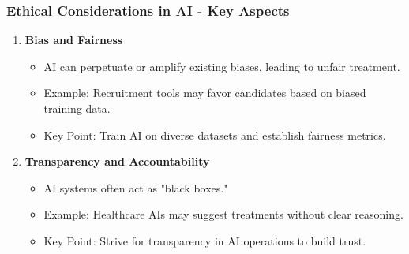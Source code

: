\documentclass[aspectratio=169]{beamer}
\begin{document}
\begin{frame}[fragile]
    \frametitle{Ethical Considerations in AI - Key Aspects}
    \begin{enumerate}
        \item \textbf{Bias and Fairness}
            \begin{itemize}
                \item AI can perpetuate or amplify existing biases, leading to unfair treatment.
                \item Example: Recruitment tools may favor candidates based on biased training data.
                \item Key Point: Train AI on diverse datasets and establish fairness metrics.
            \end{itemize}
        
        \item \textbf{Transparency and Accountability}
            \begin{itemize}
                \item AI systems often act as "black boxes."
                \item Example: Healthcare AIs may suggest treatments without clear reasoning.
                \item Key Point: Strive for transparency in AI operations to build trust.
            \end{itemize}
    \end{enumerate}
\end{frame}
\end{document}
